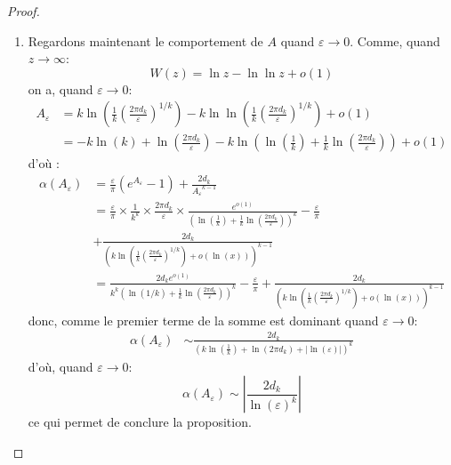\documentclass[12pt]{article}
\newcounter{prop}[section]
\newcommand{\pth}[1]{\left(#1\right)}
\newcommand{\abs}[1]{\left|#1\right|}
\begin{document}
\begin{proof}
\begin{enumerate}
\item Regardons maintenant le comportement de $A$ quand $\varepsilon\to 0$.
  Comme, quand $z\to\infty$:
  \[W(z)=\ln z-\ln\ln z+o(1)\]
  on a, quand $\varepsilon\to 0$:
  \begin{align*}
    A_\varepsilon &= k\ln\pth{\frac{1}{k}\pth{\frac{2\pi d_k}{\varepsilon}}^{1/k}}-k\ln\ln\pth{\frac{1}{k}\pth{\frac{2\pi d_k}{\varepsilon}}^{1/k}}+o(1)\\
    & = -k\ln\pth{k}+\ln\pth{\frac{2\pi d_k}{\varepsilon}}-k\ln\pth{\ln\pth{\frac{1}{k}}+\frac1k\ln\pth{\frac{2\pi d_k}{\varepsilon}}}+o(1)
  \end{align*}
  d'où :
  \begin{align*}
    \alpha(A_\varepsilon) &= \frac{\varepsilon}{\pi}(e^{A_\varepsilon}-1) + \frac{2d_k}{{A_\varepsilon}^{k-1}}\\
    & = \frac{\varepsilon}{\pi}\times\frac{1}{k^k}\times\frac{2\pi d_k}{\varepsilon}\times\frac{e^{o(1)}}{\pth{\ln\pth{\frac{1}{k}}+\frac1k\ln\pth{\frac{2\pi d_k}{\varepsilon}}}^k} - \frac{\varepsilon}{\pi}\\
    & + \frac{2d_k}{\pth{k\ln\pth{\frac{1}{k}\pth{\frac{2\pi d_k}{\varepsilon}}^{1/k}}+o(\ln(x))}^{k-1}}\\
    &=\frac{2d_ke^{o(1)}}{k^k\pth{\ln(1/k)+\frac{1}{k}\ln\pth{\frac{2\pi d_k}{\varepsilon}}}^k}-\frac{\varepsilon}{\pi}
     + \frac{2d_k}{\pth{k\ln\pth{\frac{1}{k}\pth{\frac{2\pi d_k}{\varepsilon}}^{1/k}}+o(\ln(x))}^{k-1}}
  \end{align*}
  donc, comme le premier terme de la somme est dominant quand $\varepsilon\to 0$:
  \begin{align*}
    \alpha(A_{\varepsilon})& \sim \frac{2 d_k}{\pth{k\ln\pth{\frac{1}{k}}+\ln\pth{2\pi d_k}+\abs{\ln\pth{\varepsilon}}}^k}%
  \end{align*}
  d'où, quand $\varepsilon\to 0$:
  \[\alpha(A_\varepsilon)\sim \abs{\frac{2 d_k}{\ln\pth{\varepsilon}^k}}\]
  ce qui permet de conclure la proposition. 
\end{enumerate}
\end{proof}
\end{document}
